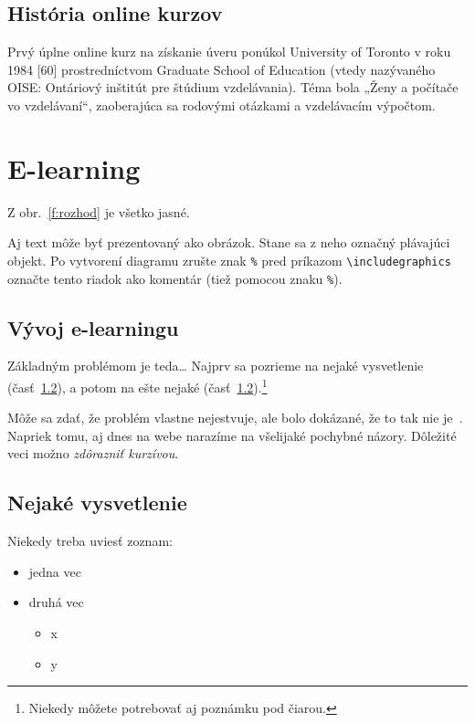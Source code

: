 \documentclass[10pt,twoside,slovak,a4paper]{article}
\begin{document}
\subsection{História online kurzov} \label{historia}

Prvý úplne online kurz na získanie úveru ponúkol University of Toronto v roku 1984 [60] prostredníctvom Graduate School of Education (vtedy nazývaného OISE: Ontáriový inštitút pre štúdium vzdelávania). Téma bola „Ženy a počítače vo vzdelávaní“, zaoberajúca sa rodovými otázkami a vzdelávacím výpočtom.


\section{E-learning} \label{elearning}

Z obr.~\ref{f:rozhod} je všetko jasné. 

\begin{figure*}[tbh]
\centering

Aj text môže byť prezentovaný ako obrázok. Stane sa z neho označný plávajúci objekt. Po vytvorení diagramu zrušte znak \texttt{\%} pred príkazom \verb|\includegraphics| označte tento riadok ako komentár (tiež pomocou znaku \texttt{\%}).
\caption{Rozhodujúci argument.}
\label{f:rozhod}
\end{figure*}


\subsection{Vývoj e-learningu} \label{vyvoj}

Základným problémom je teda\ldots{} Najprv sa pozrieme na nejaké vysvetlenie (časť~\ref{ina:nejake}), a potom na ešte nejaké (časť~\ref{ina:nejake}).\footnote{Niekedy môžete potrebovať aj poznámku pod čiarou.}

Môže sa zdať, že problém vlastne nejestvuje\cite{Coplien:MPD}, ale bolo dokázané, že to tak nie je~\cite{Czarnecki:Staged, Czarnecki:Progress}. Napriek tomu, aj dnes na webe narazíme na všelijaké pochybné názory\cite{PLP-Framework}. Dôležité veci možno \emph{zdôrazniť kurzívou}.


\subsection{Nejaké vysvetlenie} \label{ina:nejake}

Niekedy treba uviesť zoznam:

\begin{itemize}
\item jedna vec
\item druhá vec
	\begin{itemize}
	\item x
	\item y
	\end{itemize}
\end{itemize}
\end{document}
